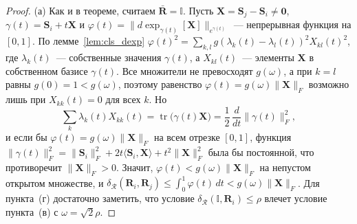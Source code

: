 \begin{proof}
(а) Как и в теореме, считаем $\bar{\mathbf{R}} = \mathbb{I}$. Пусть $\mathbf{X} = \mathbf{S}_j - \mathbf{S}_i \neq \mathbf{0}$, $\gamma(t) = \mathbf{S}_i + t\mathbf{X}$ и $\varphi(t) = \|d\exp_{\gamma(t)}[\mathbf{X}]\|_{e^{\gamma(t)}}$~--- непрерывная функция на $[0,1]$. По лемме~\ref{lem:cls_dexp} $\varphi(t)^2 = \sum_{k,l} g(\lambda_k(t) - \lambda_l(t))^2 X_{kl}(t)^2$, где $\lambda_k(t)$~--- собственные значения $\gamma(t)$, а $X_{kl}(t)$~--- элементы $\mathbf{X}$ в собственном базисе $\gamma(t)$. Все множители не превосходят $g(\omega)$, а при $k = l$ равны $g(0) = 1 < g(\omega)$, поэтому равенство $\varphi(t) = g(\omega)\|\mathbf{X}\|_F$ возможно лишь при $X_{kk}(t) = 0$ для всех $k$. Но
\begin{equation*}
\sum_{k} \lambda_k(t) X_{kk}(t) = \operatorname{tr}\big(\gamma(t)\mathbf{X}\big) = \frac{1}{2}\,\frac{d}{dt}\|\gamma(t)\|_F^2 ,
\end{equation*}
и если бы $\varphi(t) = g(\omega)\|\mathbf{X}\|_F$ на всем отрезке $[0,1]$, функция $\|\gamma(t)\|_F^2 = \|\mathbf{S}_i\|_F^2 + 2t\langle \mathbf{S}_i, \mathbf{X}\rangle + t^2\|\mathbf{X}\|_F^2$ была бы постоянной, что противоречит $\|\mathbf{X}\|_F > 0$. Значит, $\varphi(t) < g(\omega)\|\mathbf{X}\|_F$ на непустом открытом множестве, и $\delta_{\mathcal{R}}(\mathbf{R}_i, \mathbf{R}_j) \leqslant \int_0^1 \varphi(t)\, dt < g(\omega)\|\mathbf{X}\|_F$. Для пункта~(г) достаточно заметить, что условие $\delta_{\mathcal{R}}(\mathbb{I}, \mathbf{R}_i) \leqslant \rho$ влечет условие пункта~(в) с $\omega = \sqrt{2}\rho$.


\end{proof}
